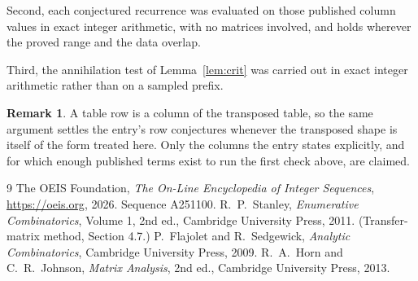 \documentclass[11pt,a4paper]{article}
\theoremstyle{plain}
\theoremstyle{definition}
\newtheorem{remark}[theorem]{Remark}
\begin{document}
Second, each conjectured recurrence was evaluated on those published column values in exact
integer arithmetic, with no matrices involved, and holds wherever the proved range and the
data overlap.

Third, the annihilation test of Lemma~\ref{lem:crit} was carried out in exact integer
arithmetic rather than on a sampled prefix.

\begin{remark}
A table row is a column of the transposed table, so the same argument settles the entry's row
conjectures whenever the transposed shape is itself of the form treated here. Only the columns
the entry states explicitly, and for which enough published terms exist to run the first check
above, are claimed.
\end{remark}

\begin{thebibliography}{9}
 The OEIS Foundation, \emph{The On-Line Encyclopedia of Integer
Sequences}, \url{https://oeis.org}, 2026. Sequence A251100.
 R.~P.~Stanley, \emph{Enumerative Combinatorics}, Volume 1, 2nd ed.,
Cambridge University Press, 2011. (Transfer-matrix method, Section 4.7.)
 P.~Flajolet and R.~Sedgewick, \emph{Analytic Combinatorics}, Cambridge
University Press, 2009.
 R.~A.~Horn and C.~R.~Johnson, \emph{Matrix Analysis}, 2nd ed., Cambridge
University Press, 2013.
\end{thebibliography}
\end{document}
